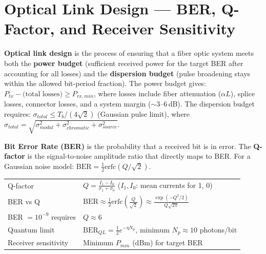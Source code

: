 \documentclass[12pt,a4paper]{article}
\renewcommand{\arraystretch}{1.45}
\begin{document}
\section{Optical Link Design --- BER, Q-Factor, and Receiver Sensitivity}

\textbf{Optical link design} is the process of ensuring that a fiber optic system meets both the \textbf{power budget} (sufficient received power for the target BER after accounting for all losses) and the \textbf{dispersion budget} (pulse broadening stays within the allowed bit-period fraction). The power budget gives: $P_{tx} - \text{(total losses)} \geq P_{rx,min}$, where losses include fiber attenuation ($\alpha L$), splice losses, connector losses, and a system margin ($\sim$3--6\,dB). The dispersion budget requires: $\sigma_{total} \leq T_b/(4\sqrt{2})$ (Gaussian pulse limit), where $\sigma_{total} = \sqrt{\sigma_{modal}^2 + \sigma_{chromatic}^2 + \sigma_{source}^2}$.

\begin{tcolorbox}[defbox, title={\textbf{BER and Q-Factor}}]
\textbf{Bit Error Rate (BER)} is the probability that a received bit is in error. The \textbf{Q-factor} is the signal-to-noise amplitude ratio that directly maps to BER. For a Gaussian noise model: $\text{BER} = \frac{1}{2}\text{erfc}(Q/\sqrt{2})$.
\end{tcolorbox}

\begin{tcolorbox}[formulabox, title={\textbf{Link Design Equations}}]
\renewcommand{\arraystretch}{1.55}
\begin{tabularx}{\linewidth}{B{5.0cm} X}
Q-factor & $Q = \displaystyle\frac{I_1 - I_0}{\sigma_1 + \sigma_0}$ \quad ($I_1, I_0$: mean currents for 1, 0) \\[6pt]
BER vs Q & $\text{BER} \approx \displaystyle\frac{1}{2}\text{erfc}\!\left(\frac{Q}{\sqrt{2}}\right) \approx \frac{\exp(-Q^2/2)}{Q\sqrt{2\pi}}$ \\[6pt]
BER $= 10^{-9}$ requires & $Q \approx 6$ \\[4pt]
Quantum limit & $\text{BER}_{QL} = \frac{1}{2}e^{-\eta N_p}$, minimum $N_p \approx 10$ photons/bit \\[6pt]
Receiver sensitivity & Minimum $P_{min}$ (dBm) for target BER \\[4pt]
\end{tabularx}
\end{tcolorbox}
\end{document}
